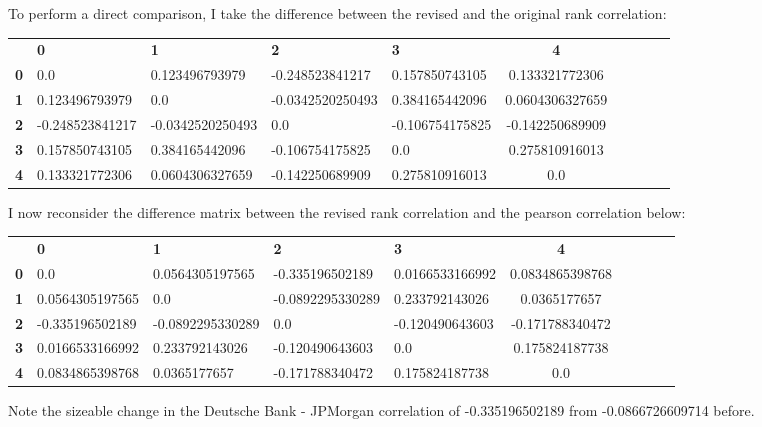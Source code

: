 \documentclass{report}
\theoremstyle{plain}
\theoremstyle{definition}
\begin{document}
To perform a direct comparison, I take the difference between the revised and the original rank correlation:

\begin{center}
	\begin{tabular}{|l|l|l|l|l|c|c|c|c|c|}
		\hline
		& \textbf{0} & \textbf{1} & \textbf{2} & \textbf{3} & \textbf{4}\\\hhline{|=|=|=|=|=|=|}
		\textbf{0} & 0.0 & 0.123496793979 & -0.248523841217 & 0.157850743105 & 0.133321772306\\
		\textbf{1} & 0.123496793979 & 0.0 & -0.0342520250493 & 0.384165442096 & 0.0604306327659\\
		\textbf{2} & -0.248523841217 & -0.0342520250493 & 0.0 & -0.106754175825 & -0.142250689909\\
		\textbf{3} & 0.157850743105 & 0.384165442096 & -0.106754175825 & 0.0 & 0.275810916013\\
		\textbf{4} & 0.133321772306 & 0.0604306327659 & -0.142250689909 & 0.275810916013 & 0.0\\
		\hline
	\end{tabular}
\end{center}

I now reconsider the difference matrix between the revised rank correlation and the pearson correlation below:

\begin{center}
	\begin{tabular}{|l|l|l|l|l|c|c|c|c|c|}
		\hline
		& \textbf{0} & \textbf{1} & \textbf{2} & \textbf{3} & \textbf{4}\\\hhline{|=|=|=|=|=|=|}
		\textbf{0} & 0.0 & 0.0564305197565 & -0.335196502189 & 0.0166533166992 & 0.0834865398768\\
		\textbf{1} & 0.0564305197565 & 0.0 & -0.0892295330289 & 0.233792143026 & 0.0365177657\\
		\textbf{2} & -0.335196502189 & -0.0892295330289 & 0.0 & -0.120490643603 & -0.171788340472\\
		\textbf{3} & 0.0166533166992 & 0.233792143026 & -0.120490643603 & 0.0 & 0.175824187738\\
		\textbf{4} & 0.0834865398768 & 0.0365177657 & -0.171788340472 & 0.175824187738 & 0.0\\
		\hline
	\end{tabular}
\end{center}

Note the sizeable change in the Deutsche Bank - JPMorgan correlation of -0.335196502189 from -0.0866726609714 before.
\end{document}
